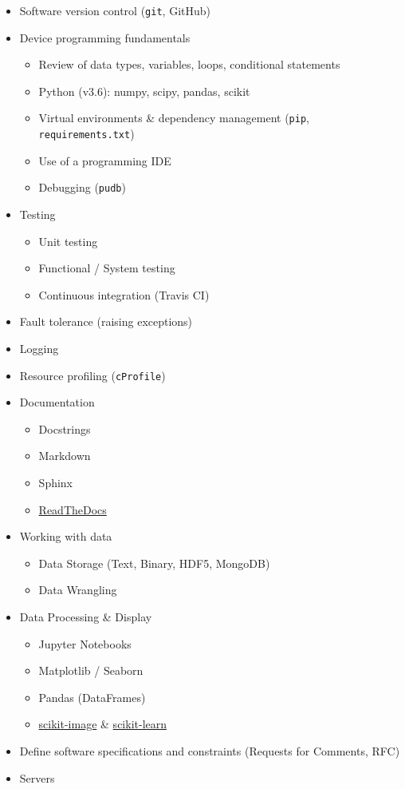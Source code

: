 \begin{itemize}
\item
  Software version control (\texttt{git}, GitHub)
\item
  Device programming fundamentals

  \begin{itemize}
  \item
    Review of data types, variables, loops, conditional statements
  \item
    Python (v3.6): numpy, scipy, pandas, scikit
  \item
    Virtual environments \& dependency management (\texttt{pip},
    \texttt{requirements.txt})
  \item
    Use of a programming IDE
  \item
    Debugging (\texttt{pudb})
  \end{itemize}
\item
  Testing

  \begin{itemize}
  \item
    Unit testing
  \item
    Functional / System testing
  \item
    Continuous integration (Travis CI)
  \end{itemize}
\item
  Fault tolerance (raising exceptions)
\item
  Logging
\item
  Resource profiling (\texttt{cProfile})
\item
  Documentation

  \begin{itemize}
  \item
    Docstrings
  \item
    Markdown
  \item
    Sphinx
  \item
    \href{https://readthedocs.org}{ReadTheDocs}
  \end{itemize}
\item
  Working with data

  \begin{itemize}
  \item
    Data Storage (Text, Binary, HDF5, MongoDB)
  \item
    Data Wrangling
  \end{itemize}
\item
  Data Processing \& Display

  \begin{itemize}
  \item
    Jupyter Notebooks
  \item
    Matplotlib / Seaborn
  \item
    Pandas (DataFrames)
  \item
    \href{https://scikit-image.org/}{scikit-image} \&
    \href{https://scikit-learn.org/}{scikit-learn}
  \end{itemize}
\item
  Define software specifications and constraints (Requests for Comments,
  RFC)
\item
  Servers


\end{itemize}
